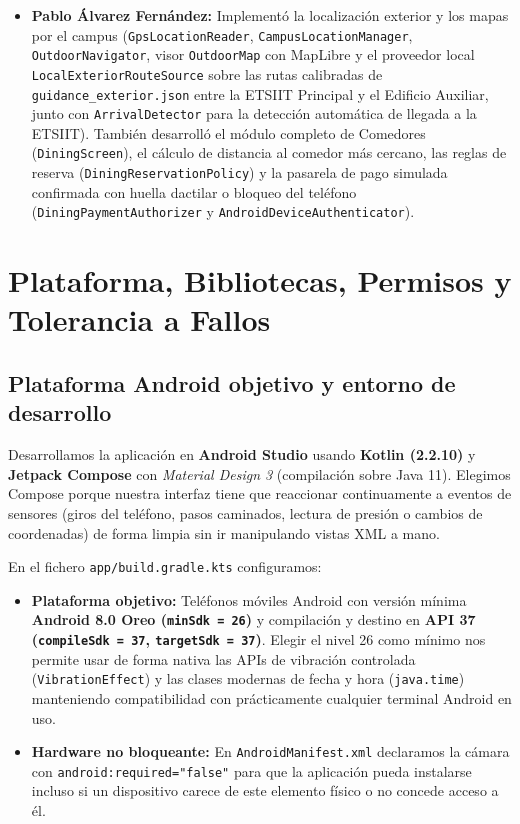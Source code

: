 \documentclass[11pt,a4paper]{article}
\begin{document}
\begin{itemize}[leftmargin=1.6em, itemsep=0.55em]
    \item \textbf{Pablo Álvarez Fernández:} Implementó la localización exterior y los mapas por el campus (\texttt{GpsLocationReader}, \texttt{CampusLocationManager}, \texttt{OutdoorNavigator}, visor \texttt{OutdoorMap} con MapLibre y el proveedor local \texttt{LocalExteriorRouteSource} sobre las rutas calibradas de \texttt{guidance\_exterior.json} entre la ETSIIT Principal y el Edificio Auxiliar, junto con \texttt{ArrivalDetector} para la detección automática de llegada a la ETSIIT). También desarrolló el módulo completo de Comedores (\texttt{DiningScreen}), el cálculo de distancia al comedor más cercano, las reglas de reserva (\texttt{DiningReservationPolicy}) y la pasarela de pago simulada confirmada con huella dactilar o bloqueo del teléfono (\texttt{DiningPaymentAuthorizer} y \texttt{AndroidDeviceAuthenticator}).
\end{itemize}

\section{Plataforma, Bibliotecas, Permisos y Tolerancia a Fallos}

\subsection{Plataforma Android objetivo y entorno de desarrollo}
Desarrollamos la aplicación en \textbf{Android Studio} usando \textbf{Kotlin (2.2.10)} y \textbf{Jetpack Compose} con \textit{Material Design 3} (compilación sobre Java 11). Elegimos Compose porque nuestra interfaz tiene que reaccionar continuamente a eventos de sensores (giros del teléfono, pasos caminados, lectura de presión o cambios de coordenadas) de forma limpia sin ir manipulando vistas XML a mano.

En el fichero \texttt{app/build.gradle.kts} configuramos:
\begin{itemize}[leftmargin=1.8em]
    \item \textbf{Plataforma objetivo:} Teléfonos móviles Android con versión mínima \textbf{Android 8.0 Oreo (\texttt{minSdk = 26})} y compilación y destino en \textbf{API 37 (\texttt{compileSdk = 37}, \texttt{targetSdk = 37})}. Elegir el nivel 26 como mínimo nos permite usar de forma nativa las APIs de vibración controlada (\texttt{VibrationEffect}) y las clases modernas de fecha y hora (\texttt{java.time}) manteniendo compatibilidad con prácticamente cualquier terminal Android en uso.
    \item \textbf{Hardware no bloqueante:} En \texttt{AndroidManifest.xml} declaramos la cámara con \texttt{android:required="false"} para que la aplicación pueda instalarse incluso si un dispositivo carece de este elemento físico o no concede acceso a él.
\end{itemize}
\end{document}
